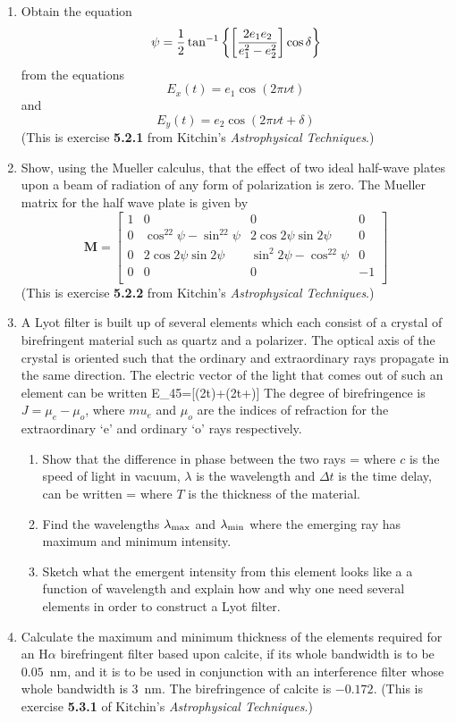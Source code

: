 \begin{enumerate}
\item Obtain the equation 
\[ \psi={1\over 2}\tan^{-1}\left\{\left[{2e_1e_2\over e_1^2-e_2^2}\right]\cos\delta\right\} \]
from the equations
\[ E_x(t)=e_1\cos(2\pi\nu t) \]
and
\[ E_y(t)=e_2\cos(2\pi\nu t+\delta) \]
(This is exercise {\bf 5.2.1} from Kitchin's {\it Astrophysical Techniques}.)
\item Show, using the Mueller calculus, that the effect of two ideal half-wave 
plates upon a beam of radiation of any form of polarization is
zero. The Mueller matrix for the half wave plate is given by 
\[
\mathbf{M}=\left[\begin{array}{cccc}
1 & 0 & 0 & 0 \\
0 & \cos^22\psi-\sin^22\psi & 2\cos 2\psi\sin 2\psi & 0 \\
0 & 2\cos 2\psi\sin 2\psi & \sin^2 2\psi-\cos^22\psi & 0 \\
0 & 0 & 0 & -1 \\ \end{array}\right]
\]
(This is exercise {\bf 5.2.2} from Kitchin's {\it Astrophysical
  Techniques}.)
\item A Lyot filter is built up of several elements which each consist
  of a crystal of birefringent material such as quartz and a
  polarizer. The optical axis of the crystal is oriented such that the
  ordinary and extraordinary rays propagate in the same direction. The
  electric vector of the light that comes out of such an element can
  be written
\be
E_{45}=[\cos(2\pi\nu t)+\cos(2\pi\nu t+\delta)]
\ee
The degree of birefringence is $J=\mu_e-\mu_o$, where $mu_e$ and
$\mu_o$ are the indices of refraction for the extraordinary `e' and
ordinary `o' rays respectively.
\begin{enumerate}
\item Show that the difference in phase between the two rays 
\be
\delta=
\ee
where $c$ is the speed of light in vacuum, $\lambda$ is the wavelength
and $\Delta t$ is the time delay, can be written
\be
\delta=
\ee
where $T$ is the thickness of the material. 
\item Find the wavelengths $\lambda_{\rm max}$ and $\lambda_{\rm min}$ where
the emerging ray has maximum and minimum intensity.
\item Sketch what the emergent intensity from this element looks like
  a a function of wavelength and explain how and why one need several
  elements in order to construct a Lyot filter.
\end{enumerate}
\item Calculate the maximum and minimum thickness of the elements required
for an H$\alpha$ birefringent filter based upon calcite, if its whole 
bandwidth is to be $0.05$~nm, and it is to be used in conjunction with an
interference filter whose whole bandwidth is 3~nm. The birefringence of 
calcite is $-0.172$.
(This is exercise {\bf 5.3.1} of Kitchin's {\it Astrophysical Techniques}.) 
\end{enumerate}
